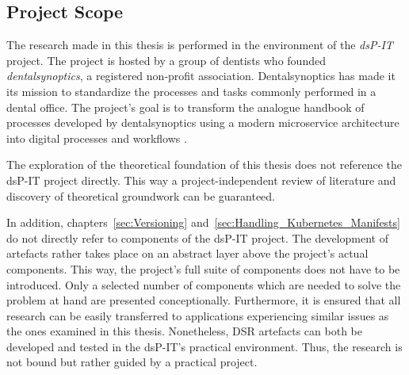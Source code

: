 
\subsection{Project Scope}%
\label{sub:Project_Scope}

The research made in this thesis is performed in the environment of the
\textit{dsP-IT} project. The project is hosted by a group of dentists who
founded \textit{dentalsynoptics}, a registered non-profit association.
Dentalsynoptics has made it its mission to standardize the processes and tasks
commonly performed in a dental office. The project's goal is to transform the
analogue handbook of processes developed by dentalsynoptics using a modern
microservice architecture into digital processes and workflows
\autocite{HomepageDentalSynoptics2018}.

The exploration of the theoretical foundation of this thesis does not reference
the dsP-IT project directly. This way a project-independent review of literature
and discovery of theoretical groundwork can be guaranteed.

In addition, chapters~\ref{sec:Versioning}
and~\ref{sec:Handling_Kubernetes_Manifests} do not directly refer to components
of the dsP-IT project. The development of artefacts rather takes place on an
abstract layer above the project's actual components. This way, the project's
full suite of components does not have to be introduced. Only a selected number
of components which are needed to solve the problem at hand are presented
conceptionally. Furthermore, it is ensured that all research can be easily
transferred to applications experiencing similar issues as the ones examined in
this thesis. Nonetheless, \ac{DSR} artefacts can both be developed and tested
in the dsP-IT's practical environment. Thus, the research is not bound but
rather guided by a practical project.
